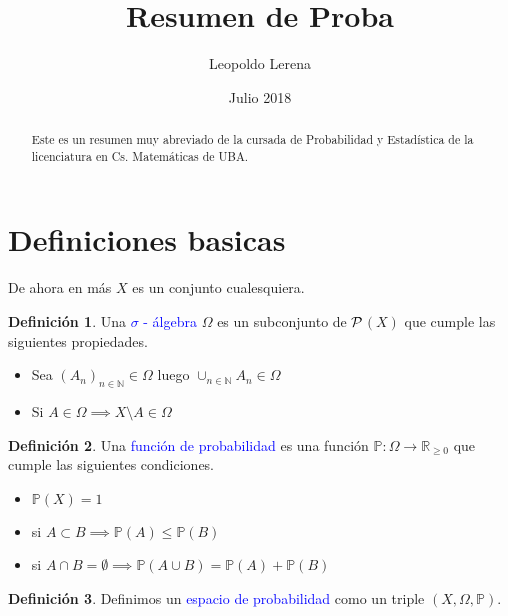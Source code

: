 \documentclass[11pt]{article}
\theoremstyle{plain} %
\theoremstyle{definition}
\newtheorem*{definicion}{Definici\'{o}n} %
\theoremstyle{remark}
\def\Om{\Omega}
\def\R{\mathbb{R}}
\def\N{\mathbb{N}}
\def\P{\mathbb{P}}
\def\blue{\textcolor{blue}}
\begin{document}
\title{Resumen de Proba}
\author{Leopoldo Lerena}
\date{Julio 2018}
\maketitle

\begin{abstract}
	Este es un resumen muy abreviado de la cursada de Probabilidad y Estad\'{i}stica de la licenciatura en Cs. Matem\'{a}ticas de UBA.
\end{abstract}


\tableofcontents


\eject



\bigskip 










\section{Definiciones basicas}
\label{sec:discretos}

De ahora en m\'as $X$ es un conjunto cualesquiera.

\begin{definicion}
	Una \blue{$\sigma$ - \'algebra} $\Omega$ es un subconjunto de $\cal{P}$$(X)$ que cumple las siguientes propiedades.
	\begin{itemize}
		\item Sea $(A_n)_{n \in \N} \in \Omega$ luego $\cup_{n \in \N} A_{n} \in \Om$
		\item Si $A \in \Om \implies X\setminus A \in \Om$
	\end{itemize}
\end{definicion}

\begin{definicion}
	Una \blue{funci\'on de probabilidad}  es una funci\'on $\mathbb P: \Om \to \R_{\geq 0}$ que cumple las siguientes condiciones.
	\begin{itemize}
		\item  $\P(X) = 1$
		\item si $A \subset B \implies \P(A) \leq \P(B)$
		\item si $A \cap B = \emptyset \implies \P(A \cup B) = \P(A) + \P(B)$
	\end{itemize}
\end{definicion}

\begin{definicion}
	Definimos un \blue{espacio de probabilidad} como un triple $\left( X,\Om,\mathbb P\right) $. 
\end{definicion}
\end{document}
